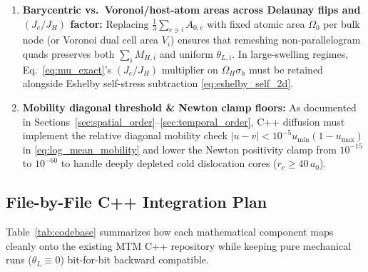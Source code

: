 \documentclass[11pt,a4paper]{article}
\begin{document}
\begin{enumerate}[nosep]
  \item \textbf{Barycentric vs.\ Voronoi/host-atom areas across Delaunay flips and $(J_e/J_H)$ factor:} Replacing $\frac{1}{3}\sum_{e\ni i}A_{0,e}$ with fixed atomic area $\Omega_0$ per bulk node (or Voronoi dual cell area $V_i$) ensures that remeshing non-parallelogram quads preserves both $\sum_i M_{H,i}$ and uniform $\theta_{L,i}$. In large-swelling regimes, Eq.~\eqref{eq:mu_exact}'s $(J_e/J_H)$ multiplier on $\Omega_H\sigma_h$ must be retained alongside Eshelby self-stress subtraction \eqref{eq:eshelby_self_2d}.
  \item \textbf{Mobility diagonal threshold \& Newton clamp floors:} As documented in Sections~\ref{sec:spatial_order}--\ref{sec:temporal_order}, C++ diffusion must implement the relative diagonal mobility check $|u - v| < 10^{-5}u_{\min}(1 - u_{\max})$ in \eqref{eq:log_mean_mobility} and lower the Newton positivity clamp from $10^{-15}$ to $10^{-60}$ to handle deeply depleted cold dislocation cores ($r_c \ge 40\,a_0$).
\end{enumerate}

\subsection{File-by-File C++ Integration Plan}
\label{subsec:cpp_plan}

Table~\ref{tab:codebase} summarizes how each mathematical component maps cleanly onto the existing MTM C++ repository while keeping pure mechanical runs ($\theta_L \equiv 0$) bit-for-bit backward compatible.
\end{document}
